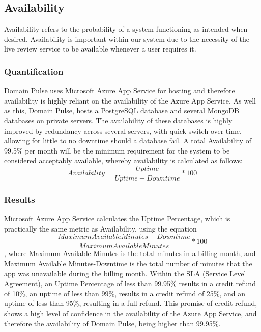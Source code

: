 \documentclass[12pt]{article}
\begin{document}
\newpage
\subsection{Availability}
Availability refers to the probability of a system functioning as intended when desired. Availability is important within our system due to the
necessity of the live review service to be available whenever a user requires it.
\subsubsection{Quantification}
Domain Pulse uses Microsoft Azure App Service for hosting and therefore availability is highly reliant on the availability of the Azure App Service.
As well as this, Domain Pulse, hosts a PostgreSQL database and several MongoDB databases on private servers. The availability of these databases
is highly improved by redundancy across several servers, with quick switch-over time, allowing for little to no downtime should a database fail.
A total Availability of 99.5\% per month will be the minimum requirement for the system to be considered acceptably available, whereby
availability is calculated as follows:
\begin{equation}
    Availability = \frac{Uptime}{Uptime + Downtime} * 100
\end{equation}

\subsubsection{Results}
Microsoft Azure App Service calculates the Uptime Percentage, which is practically the same metric as Availability, using the equation
\begin{equation}
    \frac{Maximum Available Minutes-Downtime}{Maximum Available Minutes} * 100
\end{equation}
, where Maximum Available Minutes is the total minutes in a billing month, and Maximum Available Minutes-Downtime is the total number of minutes that the app was unavailable during the billing month.
Within the SLA (Service Level Agreement), an Uptime Percentage of less than 99.95\% results in a credit refund of 10\%, an uptime of less than 99\%, results in a credit refund of 25\%, and an uptime of less than 95\%, resulting in a full refund.
This promise of credit refund, shows a high level of confidence in the availability of the Azure App Service, and therefore the availability of Domain Pulse, being higher than 99.95\%.
\end{document}
